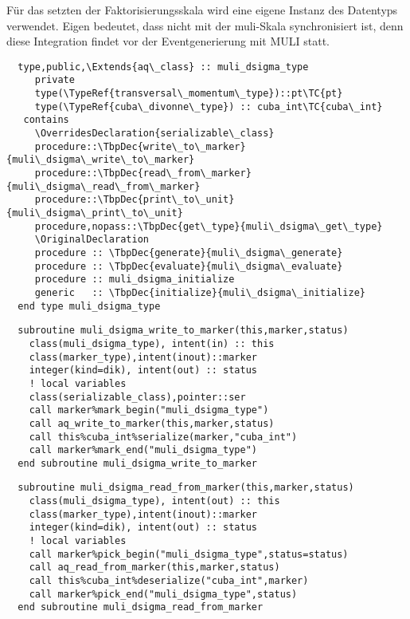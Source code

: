Für das setzten der Faktorisierungsskala wird eine eigene Instanz  des Datentyps  verwendet. Eigen bedeutet, dass  nicht mit der muli-Skala synchronisiert ist, denn diese Integration findet vor der Eventgenerierung mit MULI statt.

\begin{Verbatim}
  type,public,\Extends{aq\_class} :: muli_dsigma_type
     private
     type(\TypeRef{transversal\_momentum\_type})::pt\TC{pt}
     type(\TypeRef{cuba\_divonne\_type}) :: cuba_int\TC{cuba\_int}
   contains
     \OverridesDeclaration{serializable\_class}
     procedure::\TbpDec{write\_to\_marker}{muli\_dsigma\_write\_to\_marker}
     procedure::\TbpDec{read\_from\_marker}{muli\_dsigma\_read\_from\_marker}
     procedure::\TbpDec{print\_to\_unit}{muli\_dsigma\_print\_to\_unit}
     procedure,nopass::\TbpDec{get\_type}{muli\_dsigma\_get\_type}
     \OriginalDeclaration
     procedure :: \TbpDec{generate}{muli\_dsigma\_generate}
     procedure :: \TbpDec{evaluate}{muli\_dsigma\_evaluate}
     procedure :: muli_dsigma_initialize
     generic   :: \TbpDec{initialize}{muli\_dsigma\_initialize}
  end type muli_dsigma_type
\end{Verbatim}
\Methods
{}
\begin{Verbatim}
  subroutine muli_dsigma_write_to_marker(this,marker,status)
    class(muli_dsigma_type), intent(in) :: this
    class(marker_type),intent(inout)::marker
    integer(kind=dik), intent(out) :: status
    ! local variables
    class(serializable_class),pointer::ser
    call marker%mark_begin("muli_dsigma_type")
    call aq_write_to_marker(this,marker,status)
    call this%cuba_int%serialize(marker,"cuba_int")
    call marker%mark_end("muli_dsigma_type")
  end subroutine muli_dsigma_write_to_marker
\end{Verbatim}

\begin{Verbatim}
  subroutine muli_dsigma_read_from_marker(this,marker,status)
    class(muli_dsigma_type), intent(out) :: this
    class(marker_type),intent(inout)::marker
    integer(kind=dik), intent(out) :: status
    ! local variables
    call marker%pick_begin("muli_dsigma_type",status=status)
    call aq_read_from_marker(this,marker,status)
    call this%cuba_int%deserialize("cuba_int",marker)
    call marker%pick_end("muli_dsigma_type",status)
  end subroutine muli_dsigma_read_from_marker
\end{Verbatim}

